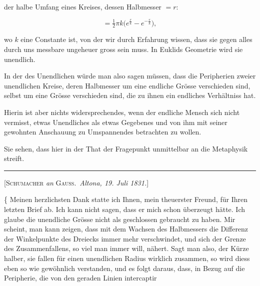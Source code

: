 %
der halbe Umfang eines Kreises, dessen Halbmesser $=r$:

\[
=\tfrac{1}{2}\pi k\bigl(e^{\frac{r}{k}}-e^{-\frac{r}{k}}\bigr),
\]

\noindent wo $k$ eine Constante ist, von der wir durch Erfahrung wissen, dass sie gegen alles durch uns messbare ungeheuer gross sein muss. In Euklids Geometrie wird sie unendlich.

In der  des Unendlichen würde man also sagen müssen, dass die Peripherien zweier unendlichen Kreise, deren Halbmesser um eine endliche Grösse verschieden sind, selbst um eine Grösse verschieden sind, die zu ihnen ein endliches Verhältniss hat.

Hierin ist aber nichts widersprechendes, wenn der endliche Mensch sich nicht vermisst, etwas Unendliches als etwas Gegebenes und von ihm mit seiner gewohnten Anschauung zu Umspannendes betrachten zu wollen.

Sie sehen, dass hier in der That der Fragepunkt unmittelbar an die Metaphysik streift.

\bigskip
\rule{4cm}{0.4pt}
\bigskip

\begin{center}
[\textsc{Schumacher} \emph{an} \textsc{Gauss}.\ \emph{Altona, 19. Juli 1831.}]
\end{center}

\smallskip
\{ Meinen herzlichsten Dank statte ich Ihnen, mein theuerster Freund, für Ihren letzten Brief ab. Ich kann nicht sagen, dass er mich schon überzeugt hätte. Ich glaube die unendliche Grösse nicht als geschlossen gebraucht zu haben. Mir scheint, man kann zeigen, dass mit dem Wachsen des Halbmessers die Differenz der Winkelpunkte des Dreiecks immer mehr verschwindet, und sich der Grenze des Zusammenfallens, so viel man immer will, nähert. Sagt man also, der Kürze halber, sie fallen für einen unendlichen Radius wirklich zusammen, so wird diess eben so wie gewöhnlich verstanden, und es folgt daraus, dass, in Bezug auf die Peripherie, die von den geraden Linien intercaptir%
